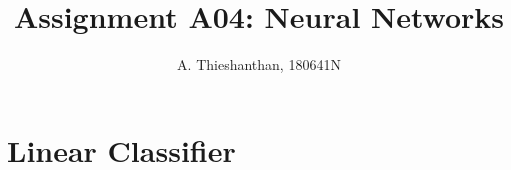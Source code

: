 \documentclass[a4paper, 12pt]{article}
\title{Assignment A04: Neural Networks}
\author{A. Thieshanthan, 180641N}
\begin{document}
	
	\maketitle
	
	\begin{abstract}
		
	\end{abstract}

	\section{Linear Classifier}
\end{document}
